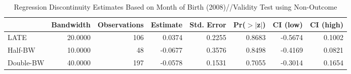 \begin{table}[ht]
\centering
\begin{tabular}{lrrrrrrr}
  \hline
 & Bandwidth & Observations & Estimate & Std. Error & Pr($>$$|$z$|$) & CI (low) & CI (high) \\ 
  \hline
LATE & 20.0000 & 106 & 0.0374 & 0.2255 & 0.8683 & -0.5674 & 0.1002 \\ 
  Half-BW & 10.0000 & 48 & -0.0677 & 0.3576 & 0.8498 & -0.4169 & 0.0821 \\ 
  Double-BW & 40.0000 & 197 & -0.0578 & 0.1531 & 0.7055 & -0.3014 & 0.1654 \\ 
   \hline
\end{tabular}
\caption{Regression Discontinuity Estimates Based on Month of Birth (2008)//Validity Test using Non-Outcome} 
\label{tab:rd2008m_non}
\end{table}

